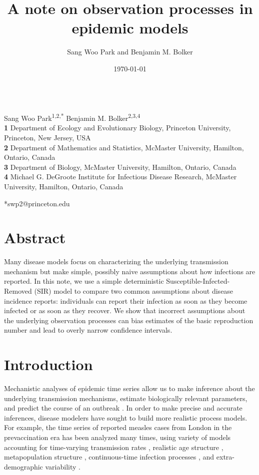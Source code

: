\documentclass[12pt]{article}\usepackage[]{graphicx}\usepackage[]{color}
\title{A note on observation processes in epidemic models}
\author{Sang Woo Park and Benjamin M. Bolker}
\date{\today}
\begin{document}
\begin{flushleft}{
	\Large
	\textbf{}
}
\newline
\\
Sang Woo Park\textsuperscript{1,2,*}
Benjamin M. Bolker\textsuperscript{2,3,4}
\\

\bigskip
\textbf{1} Department of Ecology and Evolutionary Biology, Princeton University, Princeton, New Jersey, USA
\\
\textbf{2} Department of Mathematics and Statistics, McMaster University, Hamilton, Ontario, Canada
\\
\textbf{3} Department of Biology, McMaster University, Hamilton, Ontario, Canada
\\
\textbf{4} Michael G. DeGroote Institute for Infectious Disease Research, McMaster University, Hamilton, Ontario, Canada
\\
\bigskip

*swp2@princeton.edu
\end{flushleft} 


\section*{Abstract}

Many disease models focus on characterizing
the underlying transmission mechanism but make simple, possibly naive assumptions about
how infections are reported. In this note, we use a simple deterministic
Susceptible-Infected-Removed (SIR) model to compare two common assumptions 
about disease incidence reports: individuals can report their infection as soon as
they become infected or as soon as they recover. We show that
incorrect assumptions about the underlying observation processes can bias
estimates of the basic reproduction number and lead to overly
narrow confidence intervals.

\section{Introduction}

Mechanistic analyses of epidemic time series allow us to make inference about the underlying 
transmission mechanisms, estimate biologically relevant parameters, and 
predict the course of an outbreak \citep{breto2009time}. In order to make 
precise and accurate inferences, disease modelers have sought to build
more realistic process models. For example, the time series of reported
measles cases from London in the prevaccination era has been analyzed many times, using
variety of models accounting for time-varying transmission rates \citep{fine1982measles}, 
realistic age structure \citep{schenzle1984age},
metapopulation structure \citep{xia2004measles}, continuous-time infection processes 
\citep{cauchemez2008likelihood}, and extra-demographic variability \citep{he2009plug}. 
\end{document}
